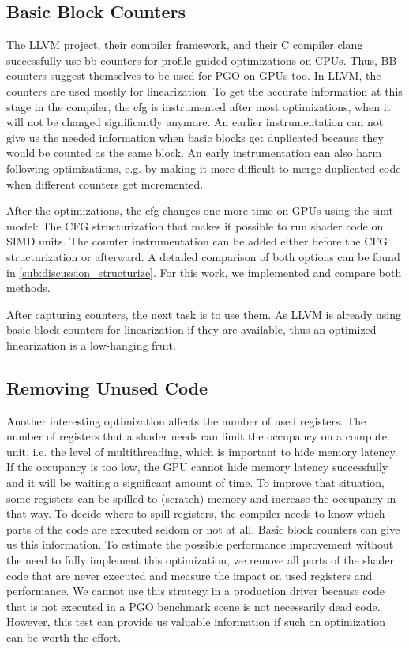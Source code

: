\subsection{Basic Block Counters}
\label{sub:design_counters}
The LLVM project, their compiler framework, and their C compiler clang successfully use \gls{bb} counters for profile-guided optimizations on CPUs. Thus, BB counters suggest themselves to be used for PGO on GPUs too.
In LLVM, the counters are used mostly for linearization. To get the accurate information at this stage in the compiler, the \gls{cfg} is instrumented after most optimizations, when it will not be changed significantly anymore.
An earlier instrumentation can not give us the needed information when basic blocks get duplicated because they would be counted as the same block.
An early instrumentation can also harm following optimizations, e.g. by making it more difficult to merge duplicated code when different counters get incremented.

After the optimizations, the \gls{cfg} changes one more time on GPUs using the \gls{simt} model: The CFG structurization that makes it possible to run shader code on SIMD units.
The counter instrumentation can be added either before the CFG structurization or afterward.
A detailed comparison of both options can be found in \cref{sub:discussion_structurize}. For this work, we implemented and compare both methods.

After capturing counters, the next task is to use them. As LLVM is already using basic block counters for linearization if they are available, thus an optimized linearization is a low-hanging fruit.

\subsection{Removing Unused Code}
\label{sub:design_unused}
Another interesting optimization affects the number of used registers.
The number of registers that a shader needs can limit the occupancy on a compute unit, i.e. the level of multithreading, which is important to hide memory latency.
If the occupancy is too low, the GPU cannot hide memory latency successfully and it will be waiting a significant amount of time.
To improve that situation, some registers can be spilled to (scratch) memory and increase the occupancy in that way.
To decide where to spill registers, the compiler needs to know which parts of the code are executed seldom or not at all.
Basic block counters can give us this information.
To estimate the possible performance improvement without the need to fully implement this optimization, we remove all parts of the shader code that are never executed and measure the impact on used registers and performance.
We cannot use this strategy in a production driver because code that is not executed in a PGO benchmark scene is not necessarily dead code.
However, this test can provide us valuable information if such an optimization can be worth the effort.

